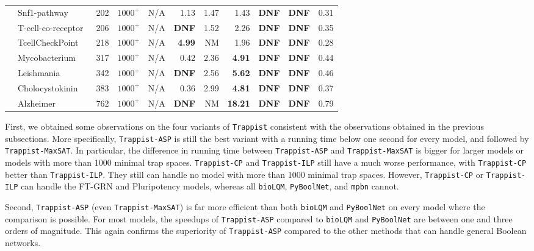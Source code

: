 \documentclass[preprint,12pt]{elsarticle}
\newcounter{rownumber}
\newcommand\rownb{\stepcounter{rownumber}\arabic{rownumber}}
\begin{document}
\begin{table}[!htb]
{\begin{tabular}{rlrrrrrrrrr}
    \midrule %
    \rownb & Snf1-pathway~\cite{Lubitz2015} & 202 & $1000^+$ & N/A & 1.13 & 1.47 & 1.43 & \textbf{DNF} & \textbf{DNF} & 0.31 \\
    \rownb & T-cell-co-receptor~\cite{DesignPrinciplesGeneNetworks} & 206 & $1000^+$ & N/A & \textbf{DNF} & 1.52 & 2.26 & \textbf{DNF} & \textbf{DNF} & 0.35 \\
    \rownb & TcellCheckPoint~\cite{hernandez2020computational} & 218 & $1000^+$ & N/A & \textbf{4.99} & NM & 1.96 & \textbf{DNF} & \textbf{DNF} & 0.28 \\
    \rownb & Mycobacterium~\cite{DesignPrinciplesGeneNetworks} & 317 & $1000^+$ & N/A & 0.42 & 2.36 & \textbf{4.91} & \textbf{DNF} & \textbf{DNF} & 0.44 \\
    \rownb & Leishmania~\cite{DesignPrinciplesGeneNetworks} & 342 & $1000^+$ & N/A & \textbf{DNF} & 2.56 & \textbf{5.62} & \textbf{DNF} & \textbf{DNF} & 0.46 \\
    \rownb & Cholocystokinin~\cite{aghamiri2020automated} & 383 & $1000^+$ & N/A & 0.36 & 2.99 & \textbf{4.81} & \textbf{DNF} & \textbf{DNF} & 0.37 \\
    \rownb & Alzheimer~\cite{aghamiri2020automated} & 762 & $1000^+$ & N/A & \textbf{DNF} & NM & \textbf{18.21} & \textbf{DNF} & \textbf{DNF} & 0.79 \\

    \bottomrule
  \end{tabular}
  }
\end{table}

First, we obtained some observations on the four variants of \texttt{Trappist} consistent with the observations obtained in the previous subsections.
More specifically, \texttt{Trappist-ASP} is still the best variant with a running time below one second for every model, and followed by \texttt{Trappist-MaxSAT}.
In particular, the difference in running time between \texttt{Trappist-ASP} and \texttt{Trappist-MaxSAT} is bigger for larger models or models with more than 1000 minimal trap spaces.
\texttt{Trappist-CP} and \texttt{Trappist-ILP} still have a much worse performance, with \texttt{Trappist-CP} better than \texttt{Trappist-ILP}.
They still can handle no model with more than 1000 minimal trap spaces.
However, \texttt{Trappist-CP} or \texttt{Trappist-ILP} can handle the FT-GRN and Pluripotency models, whereas all \texttt{bioLQM}, \texttt{PyBoolNet}, and \texttt{mpbn} cannot.

Second, \texttt{Trappist-ASP} (even \texttt{Trappist-MaxSAT}) is far more efficient than both \texttt{bioLQM} and \texttt{PyBoolNet} on every model where the comparison is possible.
For most models, the speedups of \texttt{Trappist-ASP} compared to \texttt{bioLQM} and \texttt{PyBoolNet} are between one and three orders of magnitude.
This again confirms the superiority of \texttt{Trappist-ASP} compared to the other methods that can handle general Boolean networks.
\end{document}
